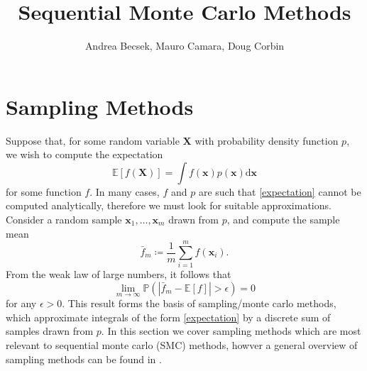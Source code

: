 \documentclass[12pt,a4paper,twocolumn]{article}
\title{Sequential Monte Carlo Methods}
\author{Andrea Becsek, Mauro Camara, Doug Corbin}
\newcommand{\x}{\boldsymbol{x}}
\newcommand{\X}{\boldsymbol{X}}
\begin{document}
\maketitle
\tableofcontents

\section{Sampling Methods}

Suppose that, for some random variable $\X$ with probability density function $p$, we wish to compute the expectation
\begin{equation}
\label{expectation}
\mathbb{E}[f(\X)] = \int f(\x) p(\x) \text{d}\x
\end{equation}
for some function $f$. In many cases, $f$ and $p$ are such that \eqref{expectation} cannot be computed analytically, therefore we must look for suitable approximations. Consider a random sample $\x_1, \ldots, \x_m$ drawn from $p$, and compute the sample mean
\begin{equation}
\label{sample mean}
\bar{f}_m \coloneqq \frac{1}{m} \sum_{i = 1}^m f(\x_i) \text{.}
\end{equation}
From the weak law of large numbers, it follows that
\begin{equation}
\lim_{m \rightarrow \infty} \mathbb{P}(|\bar{f}_m - \mathbb{E}[f]| > \epsilon) = 0
\end{equation}
for any $\epsilon > 0 $. This result forms the basis of sampling/monte carlo methods, which approximate integrals of the form \eqref{expectation} by a discrete sum of samples drawn from $p$. In this section we cover sampling methods which are most relevant to sequential monte carlo (SMC) methods, howver a general overview of sampling methods can be found in \cite{bishop:prml}.

\printbibliography
\end{document}
